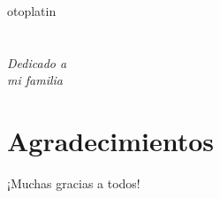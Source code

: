otoplatin\documentclass[a4paper,openright,12pt]{report}
\begin{document}
\newpage
\mbox{}
\thispagestyle{empty} %


\chapter*{}
\begin{flushright}
\textit{Dedicado a \\
mi familia}
\end{flushright}


\chapter*{Agradecimientos} %
 
¡Muchas gracias a todos!

\end{document}
